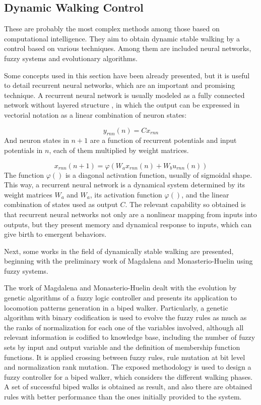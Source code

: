 \subsection{Dynamic Walking Control}
These are probably the most complex methods among those based on computational intelligence. They aim to obtain dynamic stable walking by a control based on various techniques. Among them are included neural networks, fuzzy systems and evolutionary algorithms.


Some concepts used in this section have been already presented, but it is useful to detail recurrent neural networks, which are an important and promising technique. A recurrent neural network is usually modeled as a fully connected network without layered structure \cite{Haykin98Neural}, in which the output can be expressed in vectorial notation as a linear combination of neuron states:

\begin{equation}
y_{rnn}(n)=C x_{rnn}
\end{equation}
\newline
And neuron states in $n+1$ are a function of recurrent potentials and input potentials in $n$, each of them multiplied by weight matrices.

\begin{equation}
x_{rnn}(n+1)=\varphi(W_a x_{rnn}(n)+W_b u_{rnn}(n))
\end{equation}
\newline
The function $\varphi()$ is a diagonal activation function, usually of sigmoidal shape. This way, a recurrent neural network is a dynamical system determined by its weight matrices $W_a$ and $W_a$, its activation function $\varphi()$, and the linear combination of states used as output $C$. The relevant capability so obtained is that recurrent neural networks not only are a nonlinear mapping from inputs into outputs, but they present memory and dynamical response to inputs, which can give birth to emergent behaviors.


Next, some works in the field of dynamically stable walking are presented, beginning with the preliminary work of Magdalena and Monasterio-Huelin using fuzzy systems.


The work of Magdalena and Monasterio-Huelin \cite{Magdalena97fuzzy} dealt with the evolution by genetic algorithms of a fuzzy logic controller and presents its application to locomotion patterns generation in a biped walker. Particularly, a genetic algorithm with binary codification is used to evolve the fuzzy rules as much as the ranks of normalization for each one of the variables involved, although all relevant information is codified to knowledge base, including the number of fuzzy sets by input and output variable and the definition of membership function functions. It is applied crossing between fuzzy rules, rule mutation at bit level and normalization rank mutation. The exposed methodology is used to design a fuzzy controller for a biped walker, which considers the different walking phases. A set of successful biped walks is obtained as result, and also there are obtained rules with better performance than the ones initially provided to the system. 


